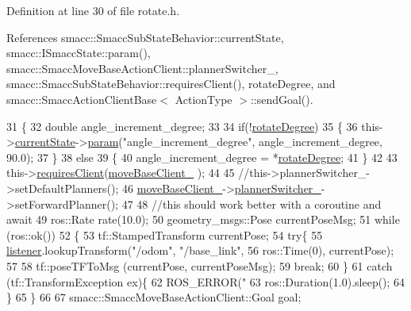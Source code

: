 Definition at line 30 of file rotate.\+h.



References smacc\+::\+Smacc\+Sub\+State\+Behavior\+::current\+State, smacc\+::\+I\+Smacc\+State\+::param(), smacc\+::\+Smacc\+Move\+Base\+Action\+Client\+::planner\+Switcher\+\_\+, smacc\+::\+Smacc\+Sub\+State\+Behavior\+::requires\+Client(), rotate\+Degree, and smacc\+::\+Smacc\+Action\+Client\+Base$<$ Action\+Type $>$\+::send\+Goal().


\begin{DoxyCode}
31   \{
32     \textcolor{keywordtype}{double}  angle\_increment\_degree;
33 
34     \textcolor{keywordflow}{if}(!\hyperlink{classRotate_a0d494e54d8311aafe97bd44b381c039c}{rotateDegree})
35     \{
36         this->\hyperlink{classsmacc_1_1SmaccSubStateBehavior_a62e2b9da4a446f09396d0b4c01659b88}{currentState}->\hyperlink{classsmacc_1_1ISmaccState_a4982f2187ed6da337462721146e8ef70}{param}(\textcolor{stringliteral}{"angle\_increment\_degree"}, angle\_increment\_degree, 90.0);
37     \}
38     \textcolor{keywordflow}{else}
39     \{
40        angle\_increment\_degree = *\hyperlink{classRotate_a0d494e54d8311aafe97bd44b381c039c}{rotateDegree};
41     \}
42 
43     this->\hyperlink{classsmacc_1_1SmaccSubStateBehavior_ae8361a9e794b02f9f3d962b881e4fd7d}{requiresClient}(\hyperlink{classRotate_ae632332fc9901b146697d5942d83ed42}{moveBaseClient\_} );
44     
45     \textcolor{comment}{//this->plannerSwitcher\_->setDefaultPlanners();}
46     \hyperlink{classRotate_ae632332fc9901b146697d5942d83ed42}{moveBaseClient\_}->\hyperlink{classsmacc_1_1SmaccMoveBaseActionClient_ae24164268108abf0b35cf51bfba5ec67}{plannerSwitcher\_}->setForwardPlanner();
47 
48     \textcolor{comment}{//this should work better with a coroutine and await}
49     ros::Rate rate(10.0);
50     geometry\_msgs::Pose currentPoseMsg;
51     \textcolor{keywordflow}{while} (ros::ok())
52     \{
53         tf::StampedTransform currentPose;
54         \textcolor{keywordflow}{try}\{
55           \hyperlink{classRotate_ad8c08acbc62347f654d979f3e34c13dc}{listener}.lookupTransform(\textcolor{stringliteral}{"/odom"}, \textcolor{stringliteral}{"/base\_link"},  
56                                 ros::Time(0), currentPose);
57 
58           tf::poseTFToMsg (currentPose, currentPoseMsg);
59         \textcolor{keywordflow}{break};
60         \}
61         \textcolor{keywordflow}{catch} (tf::TransformException ex)\{
62         ROS\_ERROR(\textcolor{stringliteral}{"%
63         ros::Duration(1.0).sleep();
64         \}
65     \}   
66 
67     smacc::SmaccMoveBaseActionClient::Goal goal;
}
\end{DoxyCode}
